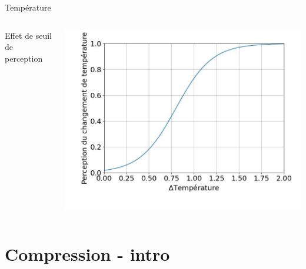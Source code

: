 \documentclass[9pt, aspectratio=169]{beamer}
\begin{document}
\begin{frame}{Température} %
\begin{columns}
   \begin{column}{0.55\textwidth}
        Effet de seuil de perception
   \end{column}
   \begin{column}{0.45\textwidth}
		\includegraphics[width=\textwidth]{fig/sigmoid_temperature.jpg}
   \end{column}
\end{columns}
\end{frame}


\section{Compression - intro}

\begin{frame}{} %
\begin{center}
\Huge \insertsection
\end{center}
\end{frame}
\end{document}
